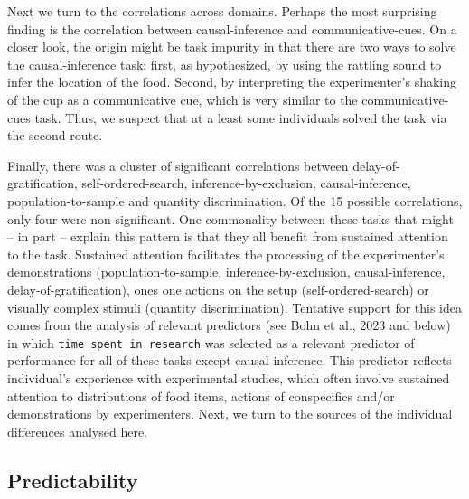 \documentclass[
  man,floatsintext]{apa6}
\begin{document}
Next we turn to the correlations across domains. Perhaps the most surprising finding is the correlation between causal-inference and communicative-cues. On a closer look, the origin might be task impurity in that there are two ways to solve the causal-inference task: first, as hypothesized, by using the rattling sound to infer the location of the food. Second, by interpreting the experimenter's shaking of the cup as a communicative cue, which is very similar to the communicative-cues task. Thus, we suspect that at a least some individuals solved the task via the second route.

Finally, there was a cluster of significant correlations between delay-of-gratification, self-ordered-search, inference-by-exclusion, causal-inference, population-to-sample and quantity discrimination. Of the 15 possible correlations, only four were non-significant. One commonality between these tasks that might -- in part -- explain this pattern is that they all benefit from sustained attention to the task. Sustained attention facilitates the processing of the experimenter's demonstrations (population-to-sample, inference-by-exclusion, causal-inference, delay-of-gratification), ones one actions on the setup (self-ordered-search) or visually complex stimuli (quantity discrimination). Tentative support for this idea comes from the analysis of relevant predictors (see Bohn et al., 2023 and below) in which \texttt{time\ spent\ in\ research} was selected as a relevant predictor of performance for all of these tasks except causal-inference. This predictor reflects individual's experience with experimental studies, which often involve sustained attention to distributions of food items, actions of conspecifics and/or demonstrations by experimenters. Next, we turn to the sources of the individual differences analysed here.

\hypertarget{predictability}{%
\subsection{Predictability}\label{predictability}}
\end{document}
